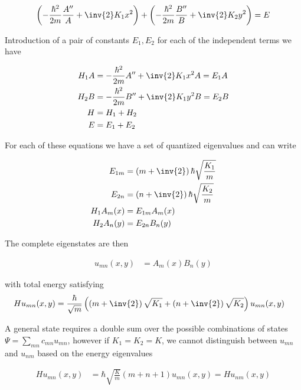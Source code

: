 \begin{align}\label{eqn:desaiCh9:401}
\left( -\frac{\hbar^2}{2m} \frac{A''}{A} + \inv{2} K_1 x^2 \right)
+\left( -\frac{\hbar^2}{2m} \frac{B''}{B} + \inv{2} K_2 y^2 \right)
= E 
\end{align}

Introduction of a pair of constants $E_1, E_2$ for each of the independent terms we have

\begin{align}\label{eqn:desaiCh9:403}
H_1 A &= -\frac{\hbar^2}{2m} A'' + \inv{2} K_1 x^2 A = E_1 A \\
H_2 B &= -\frac{\hbar^2}{2m} B'' + \inv{2} K_1 y^2 B = E_2 B \\
H &= H_1 + H_2 \\
E  &= E_1 + E_2
\end{align}

For each of these equations we have a set of quantized eigenvalues and can write

\begin{align}\label{eqn:desaiCh9:404}
E_{1m} &= \left(m + \inv{2}\right) \hbar \sqrt{\frac{K_1}{m}} \\
E_{2n} &= \left(n + \inv{2}\right) \hbar \sqrt{\frac{K_2}{m}} \\
H_1 A_m(x) &= E_{1m} A_m(x) \\
H_2 A_n(y) &= E_{2n} B_n(y)
\end{align}

The complete eigenstates are then 

\begin{align}\label{eqn:desaiCh9:405}
u_{mn}(x,y) &= A_m(x) B_n(y)
\end{align}

with total energy satisfying 
\begin{align}\label{eqn:desaiCh9:406}
H u_{mn}(x,y) &= 
\frac{\hbar}{\sqrt{m}} \left( \left(m + \inv{2}\right) \sqrt{K_1} + \left(n + \inv{2}\right) \sqrt{K_2} \right) u_{mn}(x,y)
\end{align}

A general state requires a double sum over the possible combinations of states $\Psi = \sum_{mn} c_{mn} u_{mn}$, however if $K_1 = K_2 = K$, we cannot distinguish between $u_{mn}$ and $u_{nm}$ based on the energy eigenvalues

\begin{align}\label{eqn:desaiCh9:407}
H u_{mn}(x,y) &= \hbar\sqrt{\frac{K}{m}} \left( m + n + 1 \right) u_{mn}(x,y) = H u_{nm}(x,y)
\end{align}


